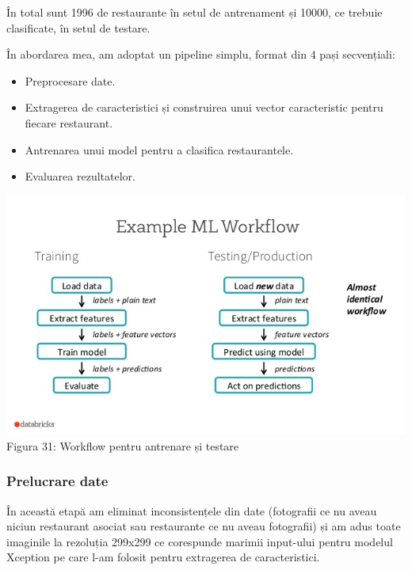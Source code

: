 În total sunt 1996 de restaurante în setul de antrenament și 10000, ce trebuie clasificate, în setul de testare.

În abordarea mea, am adoptat un pipeline simplu, format din 4 pași secvențiali:

\begin{itemize}
\item Preprocesare date.
\item Extragerea de caracteristici și construirea unui vector caracteristic pentru fiecare restaurant.
\item Antrenarea unui model pentru a clasifica restaurantele.
\item Evaluarea rezultatelor.
\end{itemize}

\begin{center}
\includegraphics[scale=0.6]{pipeline} \\
Figura 31: Workflow pentru antrenare și testare
\end{center}

\subsubsection{Prelucrare date}
În această etapă am eliminat inconsistențele din date (fotografii ce nu aveau niciun restaurant asociat sau restaurante ce nu aveau fotografii) și am adus toate imaginile la rezoluția 299x299 ce corespunde marimii input-ului pentru modelul Xception pe care l-am folosit pentru extragerea de caracteristici.

